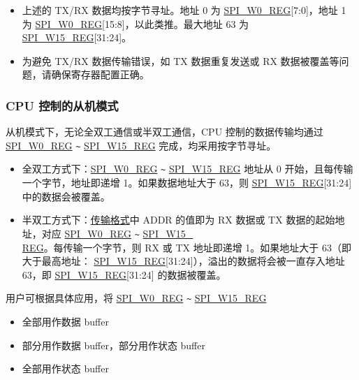 \documentclass[main\_\_CN.tex]{subfiles}
\begin{document}
\begin{tiplisting}
\vspace{-2em}
\begin{itemize}
    \item 上述的 TX/RX 数据均按字节寻址。地址 0 为  \hyperref[regdesc:SPIW0REG]{SPI\_W0\_REG}[7:0]，地址 1 为  \hyperref[regdesc:SPIW0REG]{SPI\_W0\_REG}[15:8]，以此类推。最大地址 63 为  \hyperref[regdesc:SPIW15REG]{SPI\_W15\_REG}[31:24]。
    \item 为避免 TX/RX 数据传输错误，如 TX 数据重复发送或 RX 数据被覆盖等问题，请确保寄存器配置正确。
\end{itemize}
\end{tiplisting}

\subsubsection{CPU 控制的从机模式} \label{GP-SPI slave CPU}

从机模式下，无论全双工通信或半双工通信，CPU 控制的数据传输均通过  \hyperref[regdesc:SPIW0REG]{SPI\_W0\_REG} \verb+~+ \hyperref[regdesc:SPIW15REG]{SPI\_W15\_REG} 完成，均采用按字节寻址。

\begin{itemize}
    \item 全双工方式下：\hyperref[regdesc:SPIW0REG]{SPI\_W0\_REG} \verb+~+ \hyperref[regdesc:SPIW15REG]{SPI\_W15\_REG} 地址从 0 开始，且每传输一个字节，地址即递增 1。如果数据地址大于 63，则 \hyperref[regdesc:SPIW15REG]{SPI\_W15\_REG}[31:24] 中的数据会被覆盖。
    \item 半双工方式下：\hyperref[slave communication format]{传输格式}中 ADDR 的值即为 RX 数据或 TX 数据的起始地址，对应  \hyperref[regdesc:SPIW0REG]{SPI\_W0\_REG} \verb+~+ \hyperref[regdesc:SPIW15REG]{SPI\_W15\_\\REG}。每传输一个字节，则 RX 或 TX 地址即递增 1。如果地址大于 63（即大于最高地址： \hyperref[regdesc:SPIW15REG]{SPI\_W15\_REG}[31:24]），溢出的数据将会被一直存入地址 63，即  \hyperref[regdesc:SPIW15REG]{SPI\_W15\_REG}[31:24] 的数据被覆盖。
\end{itemize}

用户可根据具体应用，将  \hyperref[regdesc:SPIW0REG]{SPI\_W0\_REG} \verb+~+ \hyperref[regdesc:SPIW15REG]{SPI\_W15\_REG}
\begin{itemize}
    \item 全部用作数据 buffer
    \item 部分用作数据 buffer，部分用作状态 buffer
    \item 全部用作状态 buffer
\end{itemize}
\end{document}

